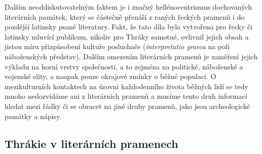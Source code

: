 Dalším neoddiskutovatelným faktem je i značný hellénocentrismus dochovaných literárních památek, který se částečně přenáší z raných řeckých pramenů i do pozdější latinsky psané literatury. Fakt, že tato díla byla vytvořena pro řecky či latinsky mluvící publikum, nikoliv pro Thráky samotné, ovlivnil jejich obsah a jistou míru přizpůsobení kultuře posluchače ({\em interpretatio graeca} na poli náboženských představ). Dalším omezením literárních pramenů je zaměření jejich výkladu na horní vrstvy společnosti, a to zejména na politické, náboženské a vojenské elity, a naopak pouze okrajové zmínky o běžné populaci. O mezikulturních kontaktech na úrovni každodenního života běžných lidí se tedy mnoho nedozvídáme ani z literárních pramenů a musíme tento druh informací hledat mezi řádky či se obracet na jiné druhy pramenů, jako jsou archeologické památky a nápisy.

\subsection[thrákie-v-literárních-pramenech]{Thrákie v literárních pramenech}

